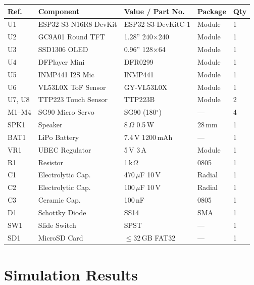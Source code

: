 \documentclass[12pt,a4paper]{article}
\begin{document}
\begin{center}
\label{tab:complist}
\scriptsize
\begin{tabular}{|C{0.08\textwidth}|L{0.28\textwidth}|L{0.18\textwidth}|L{0.15\textwidth}|C{0.06\textwidth}|}
\hline
\textbf{Ref.} & \textbf{Component} & \textbf{Value / Part No.} &
\textbf{Package} & \textbf{Qty} \\ \hline
U1 & ESP32-S3 N16R8 DevKit & ESP32-S3-DevKitC-1 & Module & 1 \\ \hline
U2 & GC9A01 Round TFT & 1.28'' 240$\times$240 & Module & 1 \\ \hline
U3 & SSD1306 OLED & 0.96'' 128$\times$64 & Module & 1 \\ \hline
U4 & DFPlayer Mini & DFR0299 & Module & 1 \\ \hline
U5 & INMP441 I2S Mic & INMP441 & Module & 1 \\ \hline
U6 & VL53L0X ToF Sensor & GY-VL53L0X & Module & 1 \\ \hline
U7, U8 & TTP223 Touch Sensor & TTP223B & Module & 2 \\ \hline
M1--M4 & SG90 Micro Servo & SG90 (180$^\circ$) & --- & 4 \\ \hline
SPK1 & Speaker & 8\,$\Omega$ 0.5\,W & 28\,mm & 1 \\ \hline
BAT1 & LiPo Battery & 7.4\,V 1200\,mAh & --- & 1 \\ \hline
VR1 & UBEC Regulator & 5\,V 3\,A & Module & 1 \\ \hline
R1 & Resistor & 1\,k$\Omega$ & 0805 & 1 \\ \hline
C1 & Electrolytic Cap. & 470\,$\mu$F 10\,V & Radial & 1 \\ \hline
C2 & Electrolytic Cap. & 100\,$\mu$F 10\,V & Radial & 1 \\ \hline
C3 & Ceramic Cap. & 100\,nF & 0805 & 1 \\ \hline
D1 & Schottky Diode & SS14 & SMA & 1 \\ \hline
SW1 & Slide Switch & SPST & --- & 1 \\ \hline
SD1 & MicroSD Card & $\leq$32\,GB FAT32 & --- & 1 \\ \hline
\end{tabular}
\end{center}

\newpage
\section{Simulation Results}
\end{document}
